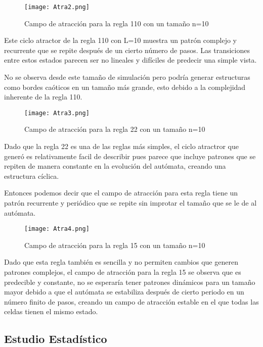 \documentclass{article}
\begin{document}
	\begin{figure}[h]
		\centering       
		\texttt{[image: Atra2.png]}
		\caption{Campo de atracción para la regla 110 con un tamaño n=10}
		\label{fig:mi_imagen1}
	\end{figure}
	
	Este ciclo atractor de la regla 110 con L=10 muestra un patrón complejo y recurrente que se repite después de un cierto número de pasos. Las transiciones entre estos estados parecen ser no lineales y difíciles de predecir una simple vista. 
	
	No se observa desde este tamaño de simulación pero podría generar estructuras como bordes caóticos en un tamaño más grande, esto debido a la complejidad inherente de la regla 110. 
	
	\begin{figure}[h]
		\centering       
		\texttt{[image: Atra3.png]}
		\caption{Campo de atracción para la regla 22 con un tamaño n=10}
		\label{fig:mi_imagen1}
	\end{figure}

	Dado que la regla 22 es una de las reglas más simples, el ciclo atractror que generó es relativamente facil de describir pues parece que incluye patrones que se repiten de manera constante en la evolución del autómata, creando una estructura cíclica. 
	
	Entonces podemos decir que el campo de atracción para esta regla tiene un patrón recurrente y periódico que se repite sin improtar el tamaño que se le de al autómata.
	
	\begin{figure}[h]
		\centering       
		\texttt{[image: Atra4.png]}
		\caption{Campo de atracción para la regla 15 con un tamaño n=10}
		\label{fig:mi_imagen1}
	\end{figure}
	
	Dado que esta regla también es sencilla y no permiten cambios que generen patrones complejos, el campo de atracción para la regla 15 se observa que es predecible y constante, no se esperaría tener patrones dinámicos para un tamaño mayor debido a que el autómata se estabiliza después de cierto periodo en un número finito de pasos, creando un campo de atracción estable en el que todas las celdas tienen el mismo estado.
	
	\subsection{Estudio Estadístico}
	
\end{document}
